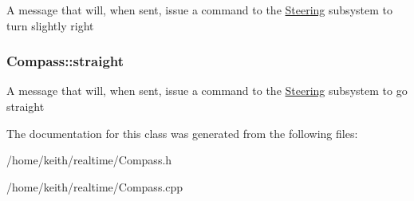 A message that will, when sent, issue a command to the \hyperlink{classSteering}{Steering} subsystem to turn slightly right \hypertarget{classCompass_aa11186aa6caf9dced42940552bf24da2}{
\subsubsection[{straight}]{ Compass\-::straight}}\label{classCompass_aa11186aa6caf9dced42940552bf24da2}
A message that will, when sent, issue a command to the \hyperlink{classSteering}{Steering} subsystem to go straight 

The documentation for this class was generated from the following files\-:\begin{DoxyCompactItemize}
\item 
/home/keith/realtime/Compass.\-h\item 
/home/keith/realtime/Compass.\-cpp\end{DoxyCompactItemize}
